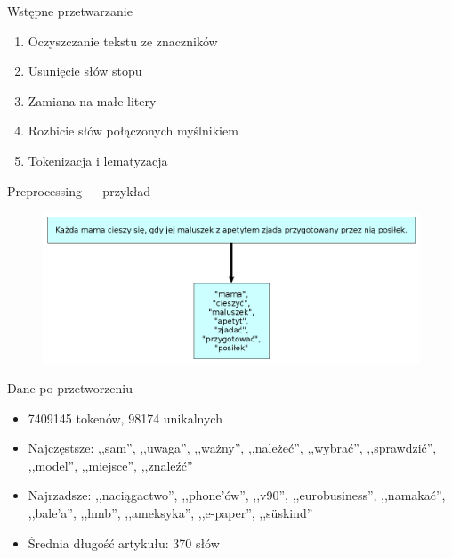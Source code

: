 \documentclass{beamer}
\begin{document}
	\begin{frame}{Wstępne przetwarzanie}
		\begin{enumerate}
			\setlength\itemsep{2em}
			\item Oczyszczanie tekstu ze znaczników
			\item Usunięcie słów stopu
			\item Zamiana na małe litery
			\item Rozbicie słów połączonych myślnikiem
			\item Tokenizacja i lematyzacja %
		\end{enumerate}
	\end{frame}
	\begin{frame}{Preprocessing --- przykład}
		\begin{figure}
			\centering
			\includegraphics[width=1\textwidth]{img/lemmatisation.png}
		\end{figure}
	\end{frame}
	
\begin{frame}{Dane po przetworzeniu}
	\begin{itemize}
		\setlength\itemsep{2em}
		\item 7409145 tokenów, 98174 unikalnych
		\item Najczęstsze: ,,sam'', ,,uwaga'', ,,ważny'', ,,należeć'', ,,wybrać'', ,,sprawdzić'',
		,,model'', ,,miejsce'', ,,znaleźć''
		\item Najrzadsze: ,,naciągactwo'', ,,phone’ów'', ,,v90'',
		,,eurobusiness'', ,,namakać'', ,,bale’a'', ,,hmb'', ,,ameksyka'', ,,e-paper'', ,,süskind''
		\item Średnia długość artykułu: 370 słów
	\end{itemize}
\end{frame}
\end{document}
